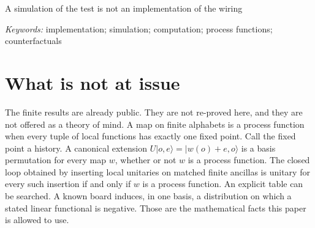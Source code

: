 \documentclass[11pt]{article}
\begin{document}
\begin{center}
{\Large A simulation of the test is not an implementation of the wiring\par}
\vspace{0.7em}
\end{center}

\begin{abstract}
A finite process function is a wiring in which every replacement of the local maps has exactly one history. A public theorem says that a canonical source-sink permutation stays unitary, under every local unitary and every matched finite ancilla, if and only if the wiring is a process function. A machine can search an explicit table and report the count of histories. That search can be implemented, in the sense that a physical device's causal transitions mirror the search's formal steps. The search does not thereby implement the wiring. The permutation is a formal relabeling, defined for wirings that fail the fixed-point test as well as for those that pass. A simulator that prints the right counterfactuals about the table supports those counterfactuals. Support of that kind is not the isomorphism between formal transitions and causal transitions that an implementation condition requires. Nothing follows about consciousness, mentality, or the moral status of any machine. The mathematics is an alternative adaptation of results already public.
\end{abstract}

\noindent\textit{Keywords:} implementation; simulation; computation; process functions; counterfactuals

\section{What is not at issue}
\label{sec:not}

The finite results are already public. They are not re-proved here, and they are not offered as a theory of mind. A map on finite alphabets is a process function when every tuple of local functions has exactly one fixed point. Call the fixed point a history. A canonical extension \(U\lvert o,e\rangle=\lvert w(o)+e,o\rangle\) is a basis permutation for every map \(w\), whether or not \(w\) is a process function. The closed loop obtained by inserting local unitaries on matched finite ancillas is unitary for every such insertion if and only if \(w\) is a process function. An explicit table can be searched. A known board induces, in one basis, a distribution on which a stated linear functional is negative. Those are the mathematical facts this paper is allowed to use.
\end{document}
